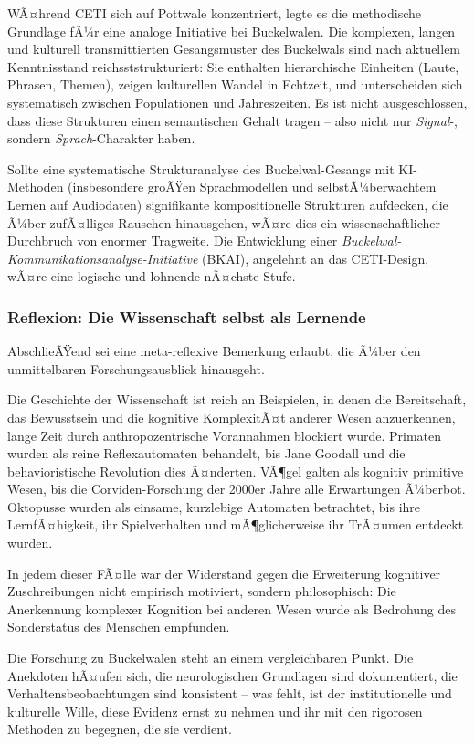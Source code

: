 ﻿\documentclass[12pt,a4paper]{article}
\theoremstyle{definition}
\theoremstyle{remark}
\begin{document}
WÃ¤hrend CETI sich auf Pottwale konzentriert, legte es die methodische Grundlage fÃ¼r eine analoge Initiative bei Buckelwalen. Die komplexen, langen und kulturell transmittierten Gesangsmuster des Buckelwals sind nach aktuellem Kenntnisstand reichsststrukturiert: Sie enthalten hierarchische Einheiten (Laute, Phrasen, Themen), zeigen kulturellen Wandel in Echtzeit, und unterscheiden sich systematisch zwischen Populationen und Jahreszeiten. Es ist nicht ausgeschlossen, dass diese Strukturen einen semantischen Gehalt tragen -- also nicht nur \emph{Signal}-, sondern \emph{Sprach}-Charakter haben.

Sollte eine systematische Strukturanalyse des Buckelwal-Gesangs mit KI-Methoden (insbesondere groÃŸen Sprachmodellen und selbstÃ¼berwachtem Lernen auf Audiodaten) signifikante kompositionelle Strukturen aufdecken, die Ã¼ber zufÃ¤lliges Rauschen hinausgehen, wÃ¤re dies ein wissenschaftlicher Durchbruch von enormer Tragweite. Die Entwicklung einer \emph{Buckelwal-Kommunikationsanalyse-Initiative} (BKAI), angelehnt an das CETI-Design, wÃ¤re eine logische und lohnende nÃ¤chste Stufe.

\subsubsection{Reflexion: Die Wissenschaft selbst als Lernende}

AbschlieÃŸend sei eine meta-reflexive Bemerkung erlaubt, die Ã¼ber den unmittelbaren Forschungsausblick hinausgeht.

Die Geschichte der Wissenschaft ist reich an Beispielen, in denen die Bereitschaft, das Bewusstsein und die kognitive KomplexitÃ¤t anderer Wesen anzuerkennen, lange Zeit durch anthropozentrische Vorannahmen blockiert wurde. Primaten wurden als reine Reflexautomaten behandelt, bis Jane Goodall und die behavioristische Revolution dies Ã¤nderten. VÃ¶gel galten als kognitiv primitive Wesen, bis die Corviden-Forschung der 2000er Jahre alle Erwartungen Ã¼berbot. Oktopusse wurden als einsame, kurzlebige Automaten betrachtet, bis ihre LernfÃ¤higkeit, ihr Spielverhalten und mÃ¶glicherweise ihr TrÃ¤umen entdeckt wurden.

In jedem dieser FÃ¤lle war der Widerstand gegen die Erweiterung kognitiver Zuschreibungen nicht empirisch motiviert, sondern philosophisch: Die Anerkennung komplexer Kognition bei anderen Wesen wurde als Bedrohung des Sonderstatus des Menschen empfunden.

Die Forschung zu Buckelwalen steht an einem vergleichbaren Punkt. Die Anekdoten hÃ¤ufen sich, die neurologischen Grundlagen sind dokumentiert, die Verhaltensbeobachtungen sind konsistent -- was fehlt, ist der institutionelle und kulturelle Wille, diese Evidenz ernst zu nehmen und ihr mit den rigorosen Methoden zu begegnen, die sie verdient.
\end{document}
